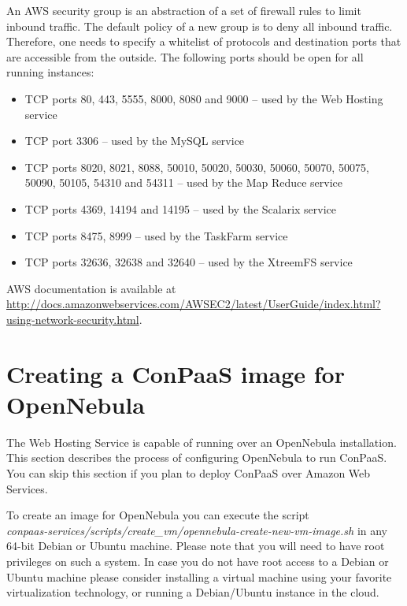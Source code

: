 \documentclass[10pt]{article}
\begin{document}
An AWS security group is an abstraction of a set of firewall rules to
limit inbound traffic. The default policy of a new group is to deny
all inbound traffic. Therefore, one needs to specify a whitelist of
protocols and destination ports that are accessible from the outside. 
The following ports should be open for all running instances: 
\begin{itemize}
\item TCP ports 80, 443, 5555, 8000, 8080 and 9000 -- used by the Web Hosting service
\item TCP port 3306 -- used by the MySQL service
\item TCP ports 8020, 8021, 8088, 50010, 50020, 50030, 50060, 50070, 50075, 50090, 50105, 54310 and 54311 -- used by the Map Reduce service
\item TCP ports 4369, 14194 and 14195 -- used by the Scalarix service
\item TCP ports 8475, 8999 -- used by the TaskFarm service
\item TCP ports 32636, 32638 and 32640 -- used by the XtreemFS service
\end{itemize}

AWS documentation is available at
\url{http://docs.amazonwebservices.com/AWSEC2/latest/UserGuide/index.html?using-network-security.html}.

\section{Creating a ConPaaS image for OpenNebula}
\label{sec:oneimage}

The Web Hosting Service is capable of running over an OpenNebula
installation. This section describes the process of configuring
OpenNebula to run ConPaaS. You can skip this section if you plan to
deploy ConPaaS over Amazon Web Services.

To create an image for OpenNebula you can execute the script\\
\textit{conpaas-services/scripts/create\_vm/opennebula-create-new-vm-image.sh}
in any 64-bit Debian or Ubuntu machine. Please note that you will need to have
root privileges on such a system. In case you do not have root access to a
Debian or Ubuntu machine please consider installing a virtual machine using
your favorite virtualization technology, or running a Debian/Ubuntu instance in
the cloud.
\end{document}

